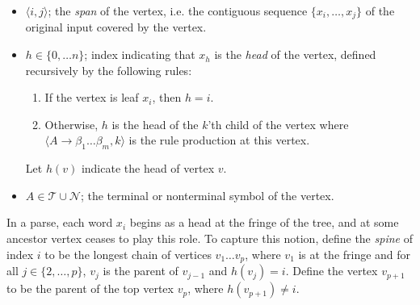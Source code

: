 \documentclass[11pt,letterpaper]{article}
\newcommand{\nonterms}{\mathcal{N}}
\newcommand{\rules}{\mathcal{R}}
\newcommand{\terms}{\mathcal{T}}
\newcommand{\Span}[1]{\langle #1 \rangle}
\begin{document}
\begin{itemize}
\item $\Span{i,j}$; the \textit{span}  of the vertex, i.e. the contiguous sequence $\{x_i, \ldots, x_j\}$ of the original input covered by the vertex.

\item $h \in \{0, \ldots n\}$; index indicating that $x_h$ is the \textit{head} of the vertex, defined recursively by the following rules:
  \begin{enumerate}
  \item  If the vertex is leaf $x_i$, then $h=i$.
  \item Otherwise,  $h$ is the head of the $k$'th child of the vertex where $\langle A \rightarrow \beta_1 \ldots \beta_m, k\rangle$  is the rule production at this vertex.
  \end{enumerate}
  Let $h(v)$ indicate the head of vertex $v$.
\item $A \in \terms \cup \nonterms$; the terminal or nonterminal symbol of the vertex.
\end{itemize}

In a parse, each word $x_i$ begins as a head at the fringe of the tree, and at some ancestor vertex ceases to play this role. To capture this notion, define the \textit{spine} of index $i$ to be the
longest chain of vertices $v_1 \ldots
v_p$, where $v_1$ is at the fringe and for all $j \in \{2, \ldots, p\}$, $v_j$ is
the parent of $v_{j-1}$ and $h(v_j) = i$.
Define the vertex $v_{p+1}$ to be the parent of the top vertex $v_p$, where $h(v_{p+1}) \neq i$.







\end{document}
